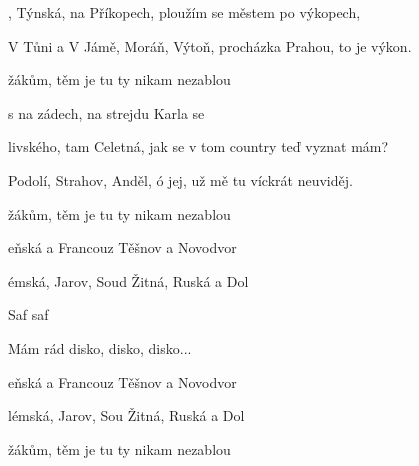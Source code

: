 

\zs
{}, Týnská, na Příkopech,
ploužím se městem po výkopech,

V Tůni a V Jámě, Moráň, Výtoň,
procházka Prahou, to je výkon.
\ks

\zr
{}žákům, těm je tu 
ty nikam nezablou

s  na zádech, 
na strejdu Karla se 
\kr

\zs
{}livského, tam Celetná,
jak se v tom country teď vyznat mám?

Podolí, Strahov, Anděl, ó jej,
už mě tu víckrát neuviděj.
\ks

\zr
{}žákům, těm je tu 
ty nikam nezablou

eňská a Francouz
Těšnov a Novodvor

émská, Jarov, Soud
Žitná, Ruská a Dol

Saf saf

Mám rád disko, disko, disko...
\kr


\zr
{}eňská a Francouz
Těšnov a Novodvor

lémská, Jarov, Sou
Žitná, Ruská a Dol
\kr

\zr
{}žákům, těm je tu 
ty nikam nezablou
\kr
\kp




